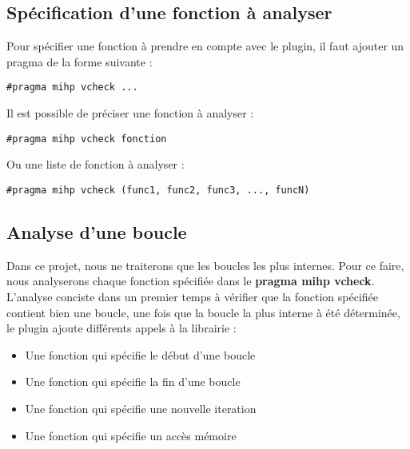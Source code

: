 \documentclass[12pt,french]{article}
\begin{document}
	\subsection{\color{blue}Spécification d'une fonction à analyser}

Pour spécifier une fonction à prendre en compte avec le plugin, il faut ajouter un pragma de la forme suivante :

\begin{center}
\color{green}
\begin{lstlisting}
#pragma mihp vcheck ...
\end{lstlisting}
\end{center}

Il est possible de préciser une fonction à analyser :

\begin{center}
\color{green}
\begin{lstlisting}
#pragma mihp vcheck fonction
\end{lstlisting}
\end{center}

Ou une liste de fonction à analyser :

\begin{center}
\color{green}
\begin{lstlisting}
#pragma mihp vcheck (func1, func2, func3, ..., funcN)
\end{lstlisting}
\end{center}

	\subsection{\color{blue}Analyse d'une boucle}

Dans ce projet, nous ne traiterons que les boucles les plus internes. Pour ce faire, nous analyserons chaque fonction spécifiée dans le \textbf{pragma mihp vcheck}. L'analyse conciste dans un premier temps à vérifier que la fonction spécifiée contient bien une boucle, une fois que la boucle la plus interne à été déterminée, le plugin ajoute différents appels à la librairie :
\vspace{0.5cm}
\begin{itemize}
\item Une fonction qui spécifie le début d'une boucle
\item Une fonction qui spécifie la fin d'une boucle
\item Une fonction qui spécifie une nouvelle iteration
\item Une fonction qui spécifie un accès mémoire
\end{itemize}
\vspace{0.5cm}
\end{document}
